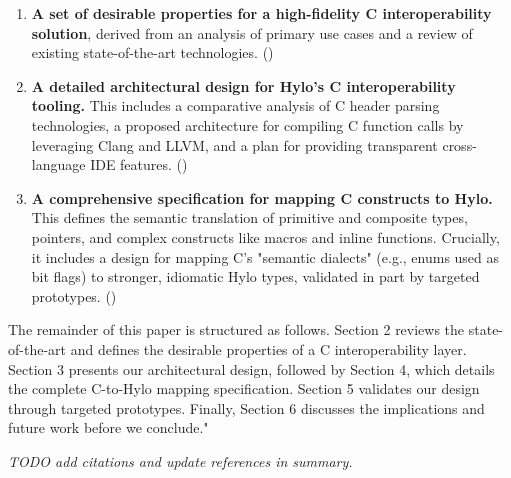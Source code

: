 \begin{enumerate}
    \item \textbf{A set of desirable properties for a high-fidelity C interoperability solution}, derived from an analysis of primary use cases and a review of existing state-of-the-art technologies. ()   
    \item \textbf{A detailed architectural design for Hylo's C interoperability tooling.} This includes a comparative analysis of C header parsing technologies, a proposed architecture for compiling C function calls by leveraging Clang and LLVM, and a plan for providing transparent cross-language IDE features. ()
    \item \textbf{A comprehensive specification for mapping C constructs to Hylo.} This defines the semantic translation of primitive and composite types, pointers, and complex constructs like macros and inline functions. Crucially, it includes a design for mapping C's "semantic dialects" (e.g., enums used as bit flags) to stronger, idiomatic Hylo types, validated in part by targeted prototypes. ()
\end{enumerate}

The remainder of this paper is structured as follows. Section 2 reviews the state-of-the-art and defines the desirable properties of a C interoperability layer. Section 3 presents our architectural design, followed by Section 4, which details the complete C-to-Hylo mapping specification. Section 5 validates our design through targeted prototypes. Finally, Section 6 discusses the implications and future work before we conclude."

\textit{TODO add citations and update references in summary.} 
    
    
    
    
